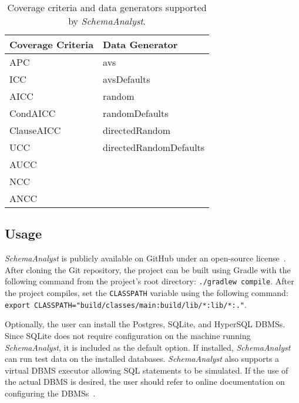 \begin{table}[]
\centering
\caption{Coverage criteria and data generators supported by \textit{SchemaAnalyst}.}
\label{tab:args}
\begin{tabular}{l|l}
\multicolumn{1}{c|}{Coverage Criteria} & Data Generator         \\ \hline
APC                                    & avs                    \\
ICC                                    & avsDefaults            \\
AICC                                   & random                 \\
CondAICC                               & randomDefaults         \\
ClauseAICC                             & directedRandom         \\
UCC                                    & directedRandomDefaults \\
AUCC                                   &                        \\
NCC                                    &                        \\
ANCC                                   &                       
\end{tabular}
\end{table}



\subsection{Usage}

\textit{SchemaAnalyst} is publicly available on GitHub under an open-source license~\cite{tool}. After
cloning the Git repository, the project can be built using Gradle with the following command from the
project's root directory: \lstinline{./gradlew compile}. After the project compiles, set the
\lstinline{CLASSPATH} variable using the following command: 
\lstinline{export CLASSPATH="build/classes/main:build/lib/*:lib/*:."}.

Optionally, the user can install the Postgres, SQLite, and HyperSQL DBMSs. Since SQLite
does not require configuration on the machine running \textit{SchemaAnalyst}, it is included as the default
option. If installed, \textit{SchemaAnalyst} can run test data on the installed databases. \textit{SchemaAnalyst}
also supports a virtual DBMS executor
allowing SQL statements to be simulated. If the use of the actual DBMS is desired, the user should refer to
online documentation on configuring the DBMSs~\cite{tool}.

